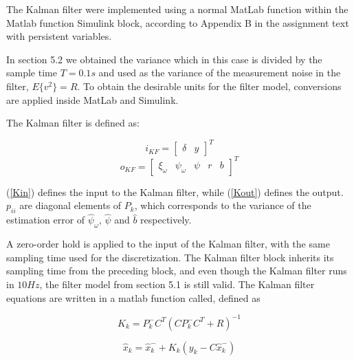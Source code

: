 
The Kalman filter were implemented using a normal MatLab function within the Matlab function Simulink block, according to Appendix B in the assignment text with persistent variables.

In section 5.2 we obtained the variance which in this case is divided by the sample time $T=0.1s$ and used as the variance of the measurement noise in the filter, $E\{v^2\} = R$. To obtain the desirable units for the filter model, conversions are applied inside MatLab and Simulink.

The Kalman filter is defined as:

\begin{equation}\label{Kin}
    {i_{KF}} = {[\begin{array}{*{20}{c}}
\delta &y
\end{array}]^T}
\end{equation}
\begin{equation}\label{Kout}
    {o_{KF}} = {\left[ {\begin{array}{*{20}{c}}
{{\xi _\omega }}&{{\psi _\omega }}&\psi &r&b
\end{array}} \right]^T}
\end{equation}

(\ref{Kin}) defines the input to the Kalman filter, while (\ref{Kout}) defines the output. $p_{ii}$ are diagonal elements of $P_{k}$, which corresponds to the variance of the estimation error of ${{{\hat \psi }_\omega }}$, ${\hat \psi }$ and ${\hat b}$ respectively.

A zero-order hold is applied to the input of the Kalman filter, with the same sampling time used for the discretization. The Kalman filter block inherits its sampling time from the preceding block, and even though the Kalman filter runs in $10Hz$, the filter model from section 5.1 is still valid. 
The Kalman filter equations are written in a matlab function called, defined as 

\begin{equation}
   {K_k} = P_k^ - {C^T}{(CP_k^ - {C^T} + R)^{ - 1}}
\end{equation}

\begin{equation}
    {{\hat x}_k} = \hat x_k^ -  + {K_k}({y_k} - C\hat x_k^ - )
\end{equation}

